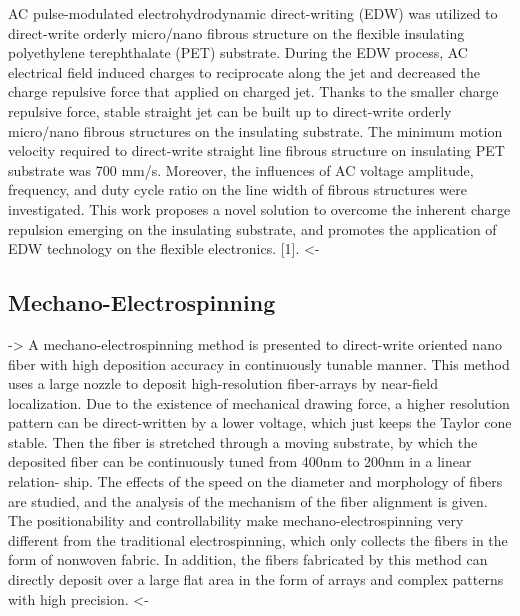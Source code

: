 \documentclass[5p,,preprint,12pt,twocolumn]{elsarticle}
\begin{document}
AC pulse-modulated electrohydrodynamic direct-writing (EDW) was utilized to direct-write orderly micro/nano fibrous structure on the flexible insulating polyethylene terephthalate (PET) substrate. During the EDW process, AC electrical field induced charges to reciprocate along the jet and decreased the charge repulsive force that applied on charged jet. Thanks to the smaller charge repulsive force, stable straight jet can be built up to direct-write orderly micro/nano fibrous structures on the insulating substrate. The minimum motion velocity required to direct-write straight line fibrous structure on insulating PET substrate was 700 mm/s. Moreover, the influences of AC voltage amplitude, frequency, and duty cycle ratio on the line width of fibrous structures were investigated. This work proposes a novel solution to overcome the inherent charge repulsion emerging on the insulating substrate, and promotes the application of EDW technology on the flexible electronics. [1]. {\textless}-



\subsection{Mechano-Electrospinning \unskip~\protect\cite{527120:11974304}}-{\textgreater} A mechano-electrospinning method is presented to direct-write oriented nano fiber with high deposition accuracy in continuously tunable manner. This method uses a large nozzle to deposit high-resolution fiber-arrays by near-field localization. Due to the existence of mechanical drawing force, a higher resolution pattern can be direct-written by a lower voltage, which just keeps the Taylor cone stable. Then the fiber is stretched through a moving substrate, by which the deposited fiber can be continuously tuned from 400nm to 200nm in a linear relation- ship. The effects of the speed on the diameter and morphology of fibers are studied, and the analysis of the mechanism of the fiber alignment is given. The positionability and controllability make mechano-electrospinning very different from the traditional electrospinning, which only collects the fibers in the form of nonwoven fabric. In addition, the fibers fabricated by this method can directly deposit over a large flat area in the form of arrays and complex patterns with high precision. {\textless}-
\end{document}
